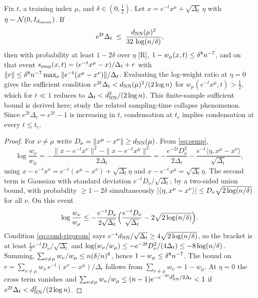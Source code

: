 \begin{lemma}\label{lem:condensation}
Fix $t$, a training index $\mu$, and $\delta\in(0,\tfrac12)$. Let $x=e^{-t}x^\mu+\sqrt{\Delta_t}\,\eta$ with $\eta\sim\mathcal N(0,I_{d_{\mathrm{latent}}})$. If
\begin{equation}\label{eq:cond-rigorous}
 e^{2t}\Delta_t\;\le\;\frac{d_{\rm NN}(\mu)^2}{32\,\log(n/\delta)},
\end{equation}
then with probability at least $1-2\delta$ over $\eta$ [R], $1-w_\mu(x,t)\le \delta^{8}n^{-7}$, and on that event $s_{\rm emp}(x,t)=(e^{-t}x^\mu-x)/\Delta_t+r$ with $\|r\|\le \delta^{8}n^{-7}\max_\nu\|e^{-t}(x^\mu-x^\nu)\|/\Delta_t$. Evaluating the log-weight ratio at $\eta=0$ gives the sufficient condition $e^{2t}\Delta_t<d_{\rm NN}(\mu)^2/(2\log n)$ for $w_\mu(e^{-t}x^\mu,t)>\tfrac12$, which for $t\ll1$ reduces to $\Delta_t<d_{\rm NN}^2/(2\log n)$. This finite-sample sufficient bound is derived here; \citet{biroli2024dynamical} study the related sampling-time collapse phenomenon. Since $e^{2t}\Delta_t=e^{2t}-1$ is increasing in $t$, condensation at $t_c$ implies condensation at every $t\le t_c$.
\end{lemma}
\begin{proof}
For $\nu\neq\mu$ write $D_\nu=\|x^\mu-x^\nu\|\ge d_{\rm NN}(\mu)$. From \eqref{eq:semp},
\[\log\frac{w_\nu}{w_\mu}=-\frac{\|x-e^{-t}x^\nu\|^2-\|x-e^{-t}x^\mu\|^2}{2\Delta_t}=-\frac{e^{-2t}D_\nu^2}{2\Delta_t}-\frac{e^{-t}\langle\eta,x^\mu-x^\nu\rangle}{\sqrt{\Delta_t}},\]
using $x-e^{-t}x^\nu=e^{-t}(x^\mu-x^\nu)+\sqrt{\Delta_t}\eta$ and $x-e^{-t}x^\mu=\sqrt{\Delta_t}\eta$. The second term is Gaussian with standard deviation $e^{-t}D_\nu/\sqrt{\Delta_t}$; by a two-sided union bound, with probability $\ge1-2\delta$ simultaneously $|\langle\eta,x^\mu-x^\nu\rangle|\le D_\nu\sqrt{2\log(n/\delta)}$ for all $\nu$. On this event
\[\log\frac{w_\nu}{w_\mu}\le-\frac{e^{-t}D_\nu}{2\sqrt{\Delta_t}}\Big(\frac{e^{-t}D_\nu}{\sqrt{\Delta_t}}-2\sqrt{2\log(n/\delta)}\Big).\]
Condition \eqref{eq:cond-rigorous} says $e^{-t}d_{\rm NN}/\sqrt{\Delta_t}\ge4\sqrt{2\log(n/\delta)}$, so the bracket is at least $\tfrac12e^{-t}D_\nu/\sqrt{\Delta_t}$ and $\log(w_\nu/w_\mu)\le-e^{-2t}D_\nu^2/(4\Delta_t)\le-8\log(n/\delta)$. Summing, $\sum_{\nu\ne\mu}w_\nu/w_\mu\le n(\delta/n)^8$, hence $1-w_\mu\le\delta^8n^{-7}$. The bound on $r=\sum_{\nu\neq\mu}w_\nu\,e^{-t}(x^\nu-x^\mu)/\Delta_t$ follows from $\sum_{\nu\ne\mu}w_\nu=1-w_\mu$. At $\eta=0$ the cross term vanishes and $\sum_{\nu\neq\mu}w_\nu/w_\mu\le(n-1)e^{-e^{-2t}d_{\rm NN}^2/2\Delta_t}<1$ if $e^{2t}\Delta_t<d_{\rm NN}^2/(2\log n)$.
\end{proof}

